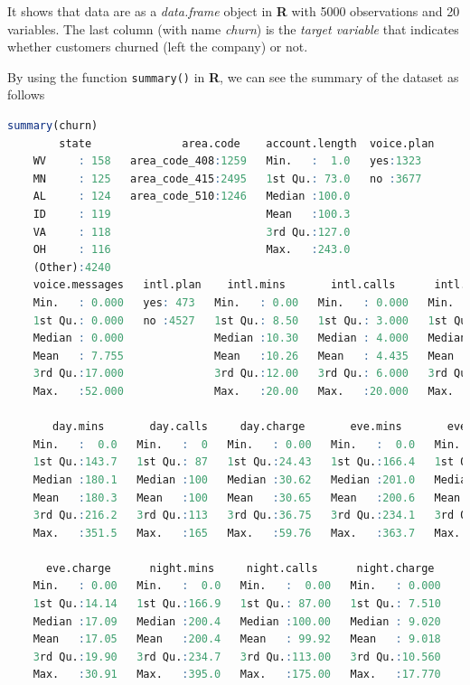 \documentclass[
]{book}
\newcommand{\passthrough}[1]{#1}
\theoremstyle{definition}
\theoremstyle{definition}
\theoremstyle{definition}
\theoremstyle{definition}
\theoremstyle{remark}
\begin{document}
It shows that data are as a \emph{data.frame} object in \textbf{R} with 5000 observations and 20 variables. The last column (with name \emph{churn}) is the \emph{target variable} that indicates whether customers churned (left the company) or not.

By using the function \passthrough{\lstinline!summary()!} in \textbf{R}, we can see the summary of the dataset as follows

\begin{lstlisting}[language=R]
summary(churn)
        state              area.code    account.length  voice.plan
    WV     : 158   area_code_408:1259   Min.   :  1.0   yes:1323  
    MN     : 125   area_code_415:2495   1st Qu.: 73.0   no :3677  
    AL     : 124   area_code_510:1246   Median :100.0             
    ID     : 119                        Mean   :100.3             
    VA     : 118                        3rd Qu.:127.0             
    OH     : 116                        Max.   :243.0             
    (Other):4240                                                  
    voice.messages   intl.plan    intl.mins       intl.calls      intl.charge   
    Min.   : 0.000   yes: 473   Min.   : 0.00   Min.   : 0.000   Min.   :0.000  
    1st Qu.: 0.000   no :4527   1st Qu.: 8.50   1st Qu.: 3.000   1st Qu.:2.300  
    Median : 0.000              Median :10.30   Median : 4.000   Median :2.780  
    Mean   : 7.755              Mean   :10.26   Mean   : 4.435   Mean   :2.771  
    3rd Qu.:17.000              3rd Qu.:12.00   3rd Qu.: 6.000   3rd Qu.:3.240  
    Max.   :52.000              Max.   :20.00   Max.   :20.000   Max.   :5.400  
                                                                                
       day.mins       day.calls     day.charge       eve.mins       eve.calls    
    Min.   :  0.0   Min.   :  0   Min.   : 0.00   Min.   :  0.0   Min.   :  0.0  
    1st Qu.:143.7   1st Qu.: 87   1st Qu.:24.43   1st Qu.:166.4   1st Qu.: 87.0  
    Median :180.1   Median :100   Median :30.62   Median :201.0   Median :100.0  
    Mean   :180.3   Mean   :100   Mean   :30.65   Mean   :200.6   Mean   :100.2  
    3rd Qu.:216.2   3rd Qu.:113   3rd Qu.:36.75   3rd Qu.:234.1   3rd Qu.:114.0  
    Max.   :351.5   Max.   :165   Max.   :59.76   Max.   :363.7   Max.   :170.0  
                                                                                 
      eve.charge      night.mins     night.calls      night.charge   
    Min.   : 0.00   Min.   :  0.0   Min.   :  0.00   Min.   : 0.000  
    1st Qu.:14.14   1st Qu.:166.9   1st Qu.: 87.00   1st Qu.: 7.510  
    Median :17.09   Median :200.4   Median :100.00   Median : 9.020  
    Mean   :17.05   Mean   :200.4   Mean   : 99.92   Mean   : 9.018  
    3rd Qu.:19.90   3rd Qu.:234.7   3rd Qu.:113.00   3rd Qu.:10.560  
    Max.   :30.91   Max.   :395.0   Max.   :175.00   Max.   :17.770  
                                                                     

\end{lstlisting}
\end{document}
